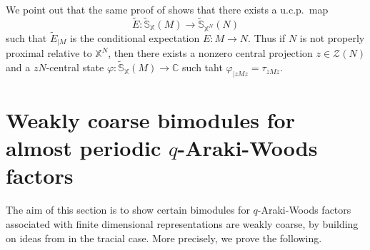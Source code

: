 \documentclass[a4paper,11pt]{amsart}
\newtheorem{lem}[thm]{Lemma}
\theoremstyle{definition}
\newcommand{\B}{{\mathbb B}}
\newcommand{\C}{{\mathbb C}}
\newcommand{\bS}{{\mathbb S}}
\newcommand{\X}{{\mathbb X}}
\newcommand{\cH}{{\mathcal H}}
\newcommand{\cZ}{{\mathcal Z}}
\begin{document}
We point out that the same proof of \cite[Lemma 3.2]{Din24} shows that there exists a u.c.p.\ map
	$$
	\widetilde E: \widetilde \bS_\X(M)\to \widetilde \bS_{\X^N}(N)
	$$	
	such that $\widetilde E_{\mid M}$ is the conditional expectation $E:M\to N$.
Thus if $N$ is not properly proximal relative to $\X^N$,
	then there exists a nonzero central projection $z\in \cZ(N)$
	and a $zN$-central state $\varphi:\widetilde\bS_\X(M)\to \C$ such taht $\varphi_{\mid zMz}=\tau_{zMz}$.	

\section{Weakly coarse bimodules for almost periodic $q$-Araki-Woods factors}\label{sec: bimod}

The aim of this section is to show certain bimodules for $q$-Araki-Woods factors associated with finite dimensional representations
	are weakly coarse, by building on ideas from \cite{Av11, Wil20} in the tracial case.
More precisely, we prove the following.
\end{document}

